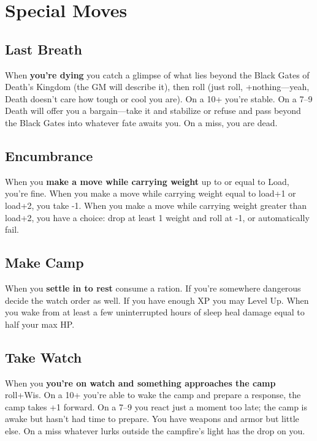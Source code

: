 \chapter{Special Moves}
   
 


\section{Last Breath}   
 

When {\bf you're dying}  you catch a glimpse of what lies beyond the Black Gates of Death's Kingdom (the GM will describe it), then roll (just roll, +nothing—yeah, Death doesn't care how tough or cool you are). On a 10+ you're stable. On a 7–9 Death will offer you a bargain—take it and stabilize or refuse and pass beyond the Black Gates into whatever fate awaits you. On a miss, you are dead.

 
\section{Encumbrance}   
 

When you {\bf make a move while carrying weight}  up to or equal to Load, you're fine. When you make a move while carrying weight equal to load+1 or load+2, you take -1. When you make a move while carrying weight greater than load+2, you have a choice: drop at least 1 weight and roll at -1, or automatically fail.

 
\section{Make Camp}   
 

When you {\bf settle in to rest}  consume a ration. If you're somewhere dangerous decide the watch order as well. If you have enough XP you may Level Up. When you wake from at least a few uninterrupted hours of sleep heal damage equal to half your max HP.

 
\section{Take Watch}   
 

When you {\bf you're on watch and something approaches the camp}  roll+Wis. On a 10+ you're able to wake the camp and prepare a response, the camp takes +1 forward. On a 7–9 you react just a moment too late; the camp is awake but hasn't had time to prepare. You have weapons and armor but little else. On a miss whatever lurks outside the campfire's light has the drop on you.

